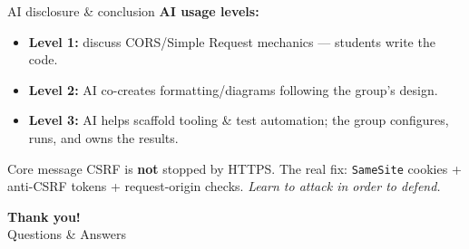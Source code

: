 \documentclass[11pt,aspectratio=169]{beamer}
\begin{document}
\begin{frame}{AI disclosure \& conclusion}
  \textbf{AI usage levels:}
  \begin{itemize}\small
    \item \textbf{Level 1:} discuss CORS/Simple Request mechanics — students write the code.
    \item \textbf{Level 2:} AI co-creates formatting/diagrams following the group's design.
    \item \textbf{Level 3:} AI helps scaffold tooling \& test automation; the group configures, runs, and owns the results.
  \end{itemize}
  \vfill
  \begin{alertblock}{Core message}
    \small CSRF is \textbf{not} stopped by HTTPS. The real fix: \texttt{SameSite} cookies + anti-CSRF tokens + request-origin checks. \textit{Learn to attack in order to defend.}
  \end{alertblock}
\end{frame}

{
\begin{frame}[plain]
  \centering\vfill
  {\color{white}\Huge\textbf{Thank you!}}\\[10pt]
  {\color{mist}\large Questions \& Answers}
  \vfill
\end{frame}}
\end{document}
